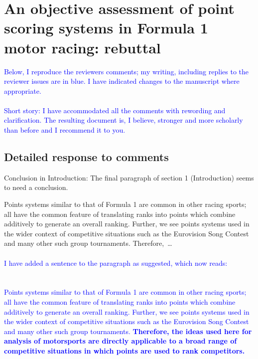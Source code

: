\documentclass[12pt]{article}
\begin{document}
\section*{An objective assessment of point scoring systems in Formula 1 motor racing: rebuttal}


\textcolor{blue}{
Below, I reproduce the reviewers comments; my writing, including
replies to the reviewer issues are in blue.  I have indicated changes
to the manuscript where appropriate.\\ \\
Short story: I have accommodated all the comments with rewording and
clarification.  The resulting document is, I believe, stronger and
more scholarly than before and I recommend it to you.
}

\subsection*{Detailed response to comments}

Conclusion in Introduction: The final paragraph of section 1
(Introduction) seems to need a conclusion.

Points systems similar to that of Formula 1 are common in other racing
sports; all have the common feature of translating ranks into points
which combine additively to generate an overall ranking.  Further, we
see points systems used in the wider context of competitive situations
such as the Eurovision Song Contest and many other such group
tournaments.  \mbox{Therefore, \ldots}\\ \\

\textcolor{blue}{\noindent I have added a sentence to the paragraph as
  suggested, which now reads:\\ \\ \\Points systems similar to that of
  Formula 1 are common in other racing sports; all have the common
  feature of translating ranks into points which combine additively to
  generate an overall ranking. Further, we see points systems used in
  the wider context of competitive situations such as the Eurovision
  Song Contest and many other such group tournaments.  {\bf Therefore,
    the ideas used here for analysis of motorsports are directly
    applicable to a broad range of competitive situations in which
    points are used to rank competitors.}}\\ \\
\end{document}
